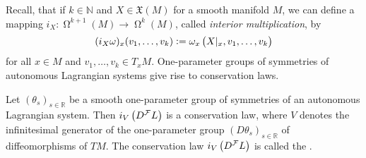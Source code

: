 Recall, that if $k \in \mathbb{N}$ and $X \in \mathfrak{X}(M)$ for a smooth manifold $M$, we can define a mapping $i_X : \upOmega^{k + 1}(M) \to \upOmega^k(M)$, called \emph{interior multiplication}, by
\begin{equation*}
	(i_X\omega)_x(v_1,\dots,v_k) := \omega_x\del[1]{X\vert_x,v_1,\dots,v_k}
\end{equation*}
\noindent for all $x \in M$ and $v_1,\dots,v_k \in T_xM$. One-parameter groups of symmetries of autonomous Lagrangian systems give rise to conservation laws. 

\begin{theorem}
	\label{thm:Noethers_theorem_Lagrangian_version}	
	Let $(\theta_s)_{s \in \mathbb{R}}$ be a smooth one-parameter group of symmetries of an autonomous Lagrangian system. Then $i_V\del[1]{D^\mathcal{F}L}$ is a conservation law, where $V$ denotes the infinitesimal generator of the one-parameter group $(D\theta_s)_{s \in \mathbb{R}}$ of diffeomorphisms of $TM$. The conservation law $i_V\del[1]{D^\mathcal{F}L}$ is called the .
\end{theorem}

